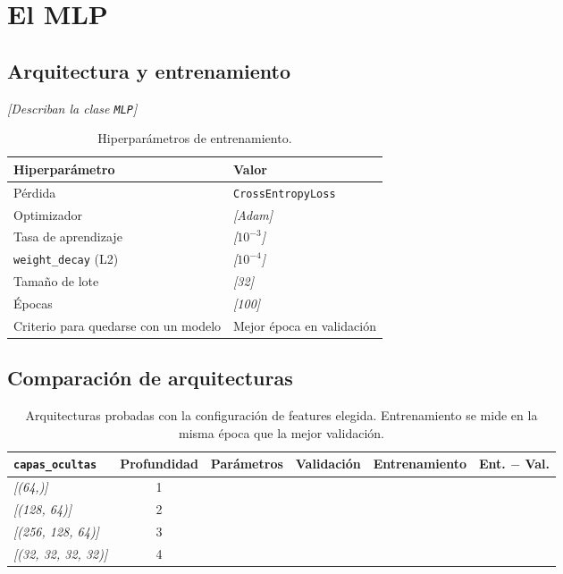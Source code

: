 \documentclass[11pt,a4paper]{article}
\newcommand{\completar}[1]{\textcolor{gris}{\textit{[#1]}}}
\begin{document}
\section{El MLP}
 
\subsection{Arquitectura y entrenamiento}
 
\completar{Describan la clase \texttt{MLP}}
 
\begin{table}[H]
  \centering
  \label{tab:hiperparametros}
  \begin{tabular}{ll}
    \toprule
    Hiperparámetro & Valor \\
    \midrule
    Pérdida & \texttt{CrossEntropyLoss} \\
    Optimizador & \completar{Adam} \\
    Tasa de aprendizaje & \completar{$10^{-3}$} \\
    \texttt{weight\_decay} (L2) & \completar{$10^{-4}$} \\
    Tamaño de lote & \completar{32} \\
    Épocas & \completar{100} \\
    Criterio para quedarse con un modelo & Mejor época en validación \\
    \bottomrule
  \end{tabular}
\caption{Hiperparámetros de entrenamiento.}
\end{table}
 
\subsection{Comparación de arquitecturas}
 
\begin{table}[H]
  \centering
  \label{tab:arquitecturas}
  \begin{tabular}{lcrccc}
    \toprule
    \texttt{capas\_ocultas} & Profundidad & Parámetros & Validación & Entrenamiento & Ent. $-$ Val. \\
    \midrule
    \completar{(64,)} & 1 & & & & \\
    \completar{(128, 64)} & 2 & & & & \\
    \completar{(256, 128, 64)} & 3 & & & & \\
    \completar{(32, 32, 32, 32)} & 4 & & & & \\
    \bottomrule
  \end{tabular}
  \caption{Arquitecturas probadas con la configuración de features elegida. Entrenamiento se mide en la misma época que la mejor validación.}
\end{table}
 
\end{document}
